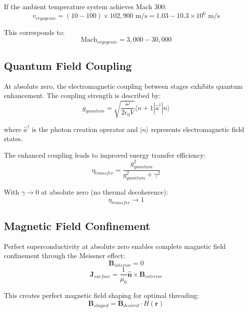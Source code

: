\documentclass[12pt,a4paper]{article}
\begin{document}
If the ambient temperature system achieves Mach 300:
\begin{equation}
v_{cryogenic} = (10-100) \times 102,900 \text{ m/s} = 1.03-10.3 \times 10^6 \text{ m/s}
\end{equation}

This corresponds to:
\begin{equation}
\text{Mach}_{cryogenic} = 3,000 - 30,000
\end{equation}

\subsection{Quantum Field Coupling}

At absolute zero, the electromagnetic coupling between stages exhibits quantum enhancement. The coupling strength is described by:
\begin{equation}
g_{quantum} = \sqrt{\frac{\omega}{2\epsilon_0 V}} \langle n+1| \hat{a}^{\dagger} |n \rangle
\end{equation}

where $\hat{a}^{\dagger}$ is the photon creation operator and $|n\rangle$ represents electromagnetic field states.

The enhanced coupling leads to improved energy transfer efficiency:
\begin{equation}
\eta_{transfer} = \frac{g_{quantum}^2}{g_{quantum}^2 + \gamma^2}
\end{equation}

With $\gamma \rightarrow 0$ at absolute zero (no thermal decoherence):
\begin{equation}
\eta_{transfer} \rightarrow 1
\end{equation}

\subsection{Magnetic Field Confinement}

Perfect superconductivity at absolute zero enables complete magnetic field confinement through the Meissner effect:
\begin{equation}
\mathbf{B}_{interior} = 0
\end{equation}
\begin{equation}
\mathbf{J}_{surface} = \frac{1}{\mu_0} \hat{\mathbf{n}} \times \mathbf{B}_{exterior}
\end{equation}

This creates perfect magnetic field shaping for optimal threading:
\begin{equation}
\mathbf{B}_{shaped} = \mathbf{B}_{desired} \cdot H(\mathbf{r})
\end{equation}
\end{document}
